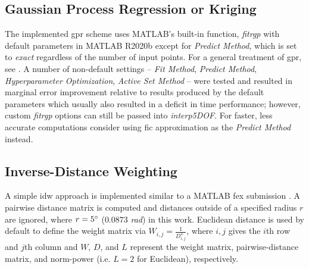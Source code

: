 \documentclass[preprint,12pt]{elsarticle}
\begin{document}
\subsection{Gaussian Process Regression or Kriging} \label{sec:methods:gpr}

The implemented \gls{gpr} scheme uses MATLAB's built-in function, \textit{fitrgp} with default parameters in MATLAB R2020b except for \textit{Predict Method}, which is set to \textit{exact} regardless of the number of input points. For a general treatment of \gls{gpr}, see \cite{}. A number of non-default settings -- \textit{Fit Method}, \textit{Predict Method}, \textit{Hyperparameter Optimization}, \textit{Active Set Method} -- were tested and resulted in marginal error improvement relative to results produced by the default parameters which usually also resulted in a deficit in time performance; however, custom \textit{fitrgp} options can still be passed into \textit{interp5DOF}. For faster, less accurate computations consider using \gls{fic} approximation as the \textit{Predict Method} instead. %


\subsection{Inverse-Distance Weighting} \label{sec:methods:idw}

A simple \gls{idw} approach is implemented similar to a MATLAB \gls{fex} submission \cite{tovarInverseDistanceWeight2020}. A pairwise distance matrix is computed and distances outside of a specified radius $r$ are ignored, where $r = 5\degree$ ($0.0873$ \textit{rad}) in this work. Euclidean distance is used by default to define the weight matrix via $W_{i,j} = \frac{1}{D_{i,j}^L}$, where $i,j$ gives the $i$th row and $j$th column and $W$, $D$, and $L$ represent the weight matrix, pairwise-distance matrix, and norm-power (i.e. $L = 2$ for Euclidean), respectively.
\end{document}
